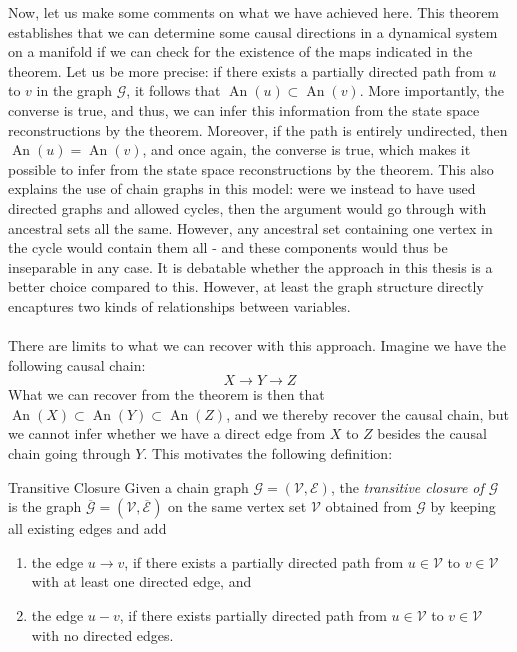 \documentclass[11pt, a4paper]{memoir}
\theoremstyle{break}
\theoremstyle{break}
\theoremstyle{nonumberplain}
\DeclareMathOperator{\an}{An}
\begin{document}
Now, let us make some comments on what we have achieved here. This theorem establishes that we can determine some causal directions in a dynamical system on a manifold if we can check for the existence of the maps indicated in the theorem. Let us be more precise: if there exists a partially directed path from $u$ to $v$ in the graph $\mathcal{G}$, it follows that $\an(u)\subset \an(v)$. More importantly, the converse is true, and thus, we can infer this information from the state space reconstructions by the theorem. Moreover, if the path is entirely undirected, then $\an(u)=\an(v)$, and once again, the converse is true, which makes it possible to infer from the state space reconstructions by the theorem. This also explains the use of chain graphs in this model: were we instead to have used directed graphs and allowed cycles, then the argument would go through with ancestral sets all the same. However, any ancestral set containing one vertex in the cycle would contain them all - and these components would thus be inseparable in any case. It is debatable whether the approach in this thesis is a better choice compared to this. However, at least the graph structure directly encaptures two kinds of relationships between variables.\\\\
There are limits to what we can recover with this approach. Imagine we have the following causal chain:
$$X\rightarrow Y\rightarrow Z$$
What we can recover from the theorem is then that $\an(X)\subset \an(Y)\subset \an(Z)$, and we thereby recover the causal chain, but we cannot infer whether we have a direct edge from $X$ to $Z$ besides the causal chain going through $Y$. This motivates the following definition:
\begin{mydefinition}{Transitive Closure}
Given a chain graph $\mathcal{G}=(\mathcal{V},\mathcal{E})$, the \emph{transitive  closure of $\mathcal{G}$} is the graph $\overline{\mathcal{G}}=(\mathcal{V},\overline{\mathcal{E}})$ on the same vertex set $\mathcal{V}$ obtained from $\mathcal{G}$ by keeping all existing edges and add
\begin{enumerate}[label=(\roman*)]
	\item the edge $u\to v$, if there exists a partially directed path from $u\in \mathcal{V}$ to $v\in \mathcal{V}$ with at least one directed edge, and
	\item the edge $u-v$, if there exists  partially directed path from $u\in \mathcal{V}$ to $v\in \mathcal{V}$ with no directed edges.
\end{enumerate} 
\end{mydefinition}
\end{document}
